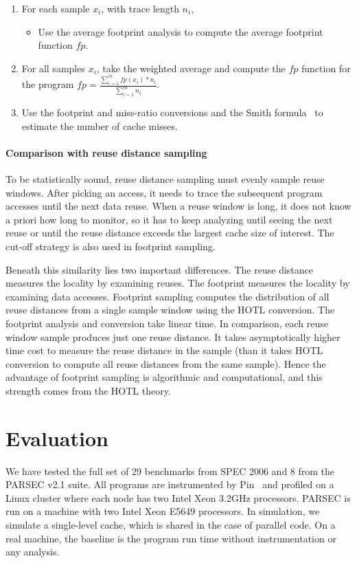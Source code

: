 \begin{enumerate}
\item For each sample $x_i$, with trace length $n_i$,
  \begin{itemize}
  \item Use the average footprint analysis to compute the average footprint function $fp$.
  \end{itemize}
\item For all samples $x_i$, take the weighted average and compute the $fp$
  function for the program $fp = \frac{\sum_{i=1}^{m} fp(x_i)*n_i}{\sum_{i=1}^{m}n_i}$.
 \item Use the footprint and miss-ratio conversions and the Smith
   formula~\cite{Smith:ICSE76} to estimate the number of cache misses.
\end{enumerate}

\paragraph{Comparison with reuse distance sampling}
To be statistically sound, reuse distance sampling must evenly sample
reuse windows.  After picking an access, it needs to trace the
subsequent program accesses until the next data reuse.  When a reuse
window is long, it does not know a priori how long to monitor, so it
has to keep analyzing until seeing the next reuse or until the reuse
distance exceeds the largest cache size of interest.  The cut-off
strategy is also used in footprint sampling.

Beneath this similarity lies two important differences.  The reuse distance
measures the locality by examining reuses.  The footprint measures the
locality by examining data accesses.  Footprint sampling computes
the distribution of all reuse distances from a single sample window using
the HOTL conversion.  The footprint analysis and conversion take
linear time.  In comparison, each reuse window sample produces
just one reuse distance.  It takes asymptotically higher time cost to
measure the reuse distance in the sample (than it takes HOTL
conversion to compute all reuse distances from the same sample). Hence
the advantage of footprint sampling is algorithmic and computational,
and this strength comes from the HOTL theory.

\section{Evaluation}
\label{sec:model_eval}

We have tested the full set of 29 benchmarks from SPEC 2006 and 8
from the PARSEC v2.1 suite.  All programs are instrumented by
Pin~\cite{Pin:PLDI05} and profiled on a Linux cluster where each node
has two Intel Xeon 3.2GHz processors.  PARSEC is run on a machine with
two Intel Xeon E5649 processors.  In simulation, we simulate a
single-level cache, which is shared in the case of parallel code.  On
a real machine, the baseline is the program run time without
instrumentation or any analysis.

